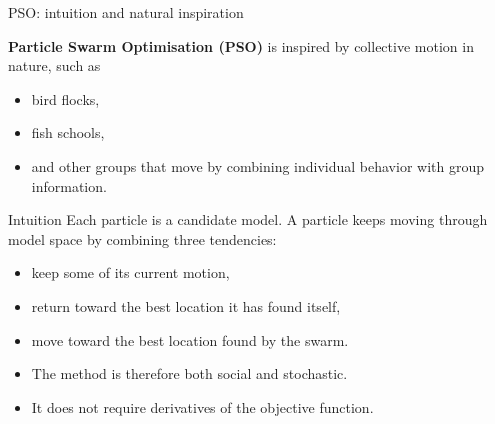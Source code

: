 \documentclass[aspectratio=169]{beamer}
\begin{document}
\begin{frame}{PSO: intuition and natural inspiration}
\small

\textbf{Particle Swarm Optimisation (PSO)} is inspired by collective motion in nature, such as
\begin{itemize}
    \item[--] bird flocks,
    \item[--] fish schools,
    \item[--] and other groups that move by combining individual behavior with group information.
\end{itemize}

\vspace{0.1cm}

\begin{alertblock}{Intuition}
Each particle is a candidate model. A particle keeps moving through model space by combining three tendencies:
\begin{itemize}
    \item[--] keep some of its current motion,
    \item[--] return toward the best location it has found itself,
    \item[--] move toward the best location found by the swarm.
\end{itemize}
\end{alertblock}

\begin{itemize}
    \item[--] The method is therefore both \alert{social} and \alert{stochastic}.
    \item[--] It does not require derivatives of the objective function.
\end{itemize}
\end{frame}
\end{document}
